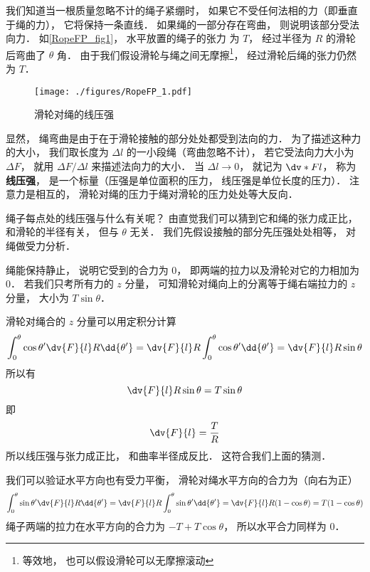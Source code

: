 

我们知道当一根质量忽略不计的绳子紧绷时， 如果它不受任何法相的力（即垂直于绳的力）， 它将保持一条直线． 如果绳的一部分存在弯曲， 则说明该部分受法向力． 如\autoref{RopeFP_fig1}， 水平放置的绳子的张力%
为 $T$， 经过半径为 $R$ 的滑轮后弯曲了 $\theta$ 角． 由于我们假设滑轮与绳之间无摩擦\footnote{等效地， 也可以假设滑轮可以无摩擦滚动}， 经过滑轮后绳的张力仍然为 $T$．
\begin{figure}[ht]
\centering
\texttt{[image: ./figures/RopeFP\_1.pdf]}
\caption{滑轮对绳的线压强} \label{RopeFP_fig1}
\end{figure}

显然， 绳弯曲是由于在于滑轮接触的部分处处都受到法向的力． 为了描述这种力的大小， 我们取长度为 $\Delta l$ 的一小段绳（弯曲忽略不计）， 若它受法向力大小为 $\Delta F$， 就用 $\Delta F/\Delta l$ 来描述法向力的大小． 当 $\Delta l \to 0$， 就记为 $\dv*{F}{l}$， 称为\textbf{线压强}， 是一个标量（压强是单位面积的压力， 线压强是单位长度的压力）． 注意力是相互的， 滑轮对绳的压力于绳对滑轮的压力处处等大反向．

绳子每点处的线压强与什么有关呢？ 由直觉我们可以猜到它和绳的张力成正比， 和滑轮的半径有关， 但与 $\theta$ 无关． 我们先假设接触的部分先压强处处相等， 对绳做受力分析．

绳能保持静止， 说明它受到的合力为 0， 即两端的拉力以及滑轮对它的力相加为 0． 若我们只考所有力的 $z$ 分量， 可知滑轮对绳向上的分离等于绳右端拉力的 $z$ 分量， 大小为 $T \sin\theta$．

滑轮对绳合的 $z$ 分量可以用定积分计算
\begin{equation}
\int_0^\theta \cos\theta' \dv{F}{l} R\dd{\theta'}
= \dv{F}{l} R \int_0^\theta \cos\theta' \dd{\theta'}
= \dv{F}{l} R \sin\theta
\end{equation}
所以有
\begin{equation}
\dv{F}{l} R \sin\theta = T \sin\theta
\end{equation}
即
\begin{equation}\label{RopeFP_eq1}
\dv{F}{l} = \frac{T}{R}
\end{equation}
所以线压强与张力成正比， 和曲率半径成反比． 这符合我们上面的猜测．

我们可以验证水平方向也有受力平衡， 滑轮对绳水平方向的合力为（向右为正）
\begin{equation}
\int_0^\theta \sin\theta' \dv{F}{l} R\dd{\theta'}
= \dv{F}{l} R \int_0^\theta \sin\theta' \dd{\theta'}
= \dv{F}{l} R (1 - \cos\theta)
= T(1 - \cos\theta)
\end{equation}
绳子两端的拉力在水平方向的合力为 $-T + T\cos\theta$， 所以水平合力同样为 0．


